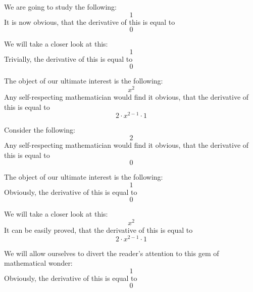 \documentclass{article}
\begin{document}
We are going to study the following:
\begin{equation}
1 
\end{equation}
It is now obvious, that the derivative of this is equal to
\begin{equation}
0 
\end{equation}

We will take a closer look at this:
\begin{equation}
1 
\end{equation}
Trivially, the derivative of this is equal to
\begin{equation}
0 
\end{equation}

The object of our ultimate interest is the following:
\begin{equation}
x ^{2 } 
\end{equation}
Any self-respecting mathematician would find it obvious, that the derivative of this is equal to
\begin{equation}
2 \cdot x ^{2 - 1 } \cdot 1 
\end{equation}

Consider the following:
\begin{equation}
2 
\end{equation}
Any self-respecting mathematician would find it obvious, that the derivative of this is equal to
\begin{equation}
0 
\end{equation}

The object of our ultimate interest is the following:
\begin{equation}
1 
\end{equation}
Obviously, the derivative of this is equal to
\begin{equation}
0 
\end{equation}

We will take a closer look at this:
\begin{equation}
x ^{2 } 
\end{equation}
It can be easily proved, that the derivative of this is equal to
\begin{equation}
2 \cdot x ^{2 - 1 } \cdot 1 
\end{equation}

We will allow ourselves to divert the reader's attention to this gem of mathematical wonder:
\begin{equation}
1 
\end{equation}
Obviously, the derivative of this is equal to
\begin{equation}
0 
\end{equation}
\end{document}
